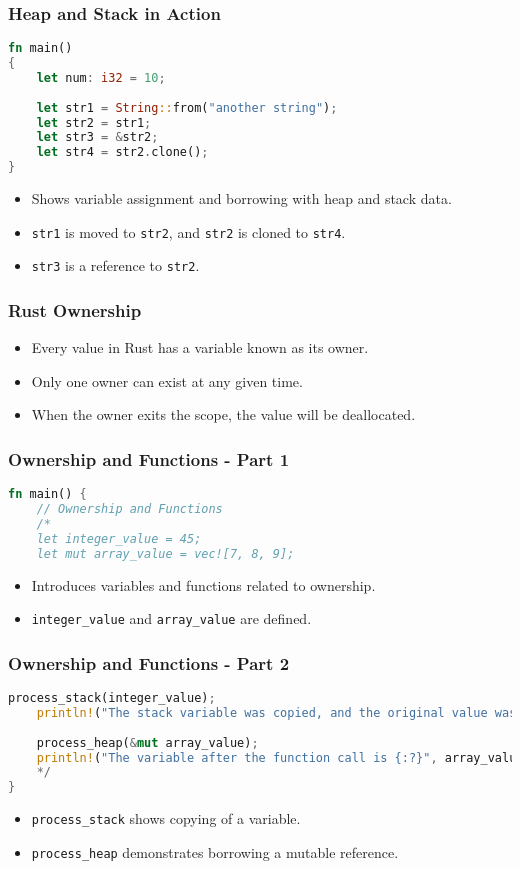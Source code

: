 \documentclass[aspectratio=169, table]{beamer}
\begin{document}
\begin{frame}[fragile]
\frametitle{Heap and Stack in Action}
\begin{lstlisting}[language=Rust]
fn main() 
{
	let num: i32 = 10; 
	
	let str1 = String::from("another string");  
	let str2 = str1; 
	let str3 = &str2; 
	let str4 = str2.clone(); 
}
\end{lstlisting}
\begin{itemize}
\item Shows variable assignment and borrowing with heap and stack data.
\item \texttt{str1} is moved to \texttt{str2}, and \texttt{str2} is cloned to \texttt{str4}.
\item \texttt{str3} is a reference to \texttt{str2}.
\end{itemize}
\end{frame}

\begin{frame}[fragile]
\frametitle{Rust Ownership}
\begin{itemize}
\item Every value in Rust has a variable known as its owner.
\item Only one owner can exist at any given time.
\item When the owner exits the scope, the value will be deallocated.
\end{itemize}
\end{frame}

\begin{frame}[fragile]
\frametitle{Ownership and Functions - Part 1}
\begin{lstlisting}[language=Rust]
fn main() { 
	// Ownership and Functions
	/*
	let integer_value = 45;  
	let mut array_value = vec![7, 8, 9]; 
\end{lstlisting}
\begin{itemize}
	\item Introduces variables and functions related to ownership.
	\item \texttt{integer\_value} and \texttt{array\_value} are defined.
\end{itemize}
\end{frame}

\begin{frame}[fragile]
\frametitle{Ownership and Functions - Part 2}
\begin{lstlisting}[language=Rust]
	process_stack(integer_value); 
	println!("The stack variable was copied, and the original value was {}", integer_value);
	
	process_heap(&mut array_value);  
	println!("The variable after the function call is {:?}", array_value);  
	*/ 
}
\end{lstlisting}
\begin{itemize}
\item \texttt{process\_stack} shows copying of a variable.
\item \texttt{process\_heap} demonstrates borrowing a mutable reference.
\end{itemize}
\end{frame}
\end{document}
